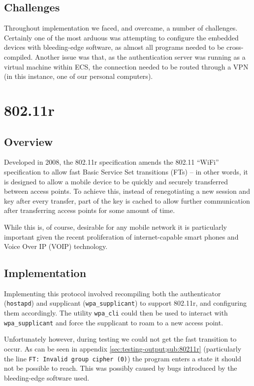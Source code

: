 \documentclass[12pt,a4paper,titlepage]{article}
\begin{document}
\subsection{Challenges}
Throughout implementation we faced, and overcame, a number of challenges. Certainly one of the most arduous was attempting to configure the embedded devices with bleeding-edge software, as almost all programs needed to be cross-compiled. Another issue was that, as the authentication server was running as a virtual machine within ECS, the connection needed to be routed through a VPN (in this instance, one of our personal computers).

\newpage
\section{802.11r}

\subsection{Overview}
Developed in 2008, the 802.11r specification amends the 802.11 ``WiFi'' specification to allow fast Basic Service Set transitions (FTs) -- in other words, it is designed to allow a mobile device to be quickly and securely transferred between access points. To achieve this, instead of renegotiating a new session and key after every transfer, part of the key is cached to allow further communication after transferring access points for some amount of time.

While this is, of course, desirable for any mobile network it is particularly important given the recent proliferation of internet-capable smart phones and Voice Over IP (VOIP) technology.

\subsection{Implementation}
Implementing this protocol involved recompiling both the authenticator (\texttt{hostapd}) and supplicant (\texttt{wpa\_supplicant}) to support 802.11r, and configuring them accordingly. The utility \texttt{wpa\_cli} could then be used to interact with \texttt{wpa\_supplicant} and force the supplicant to roam to a new access point.

Unfortunately however, during testing we could not get the fast transition to occur. As can be seen in appendix \ref{sec:testing-output;sub:80211r} (particularly the line \texttt{FT: Invalid group cipher (0)}) the program enters a state it should not be possible to reach. This was possibly caused by bugs introduced by the bleeding-edge software used.
\end{document}
